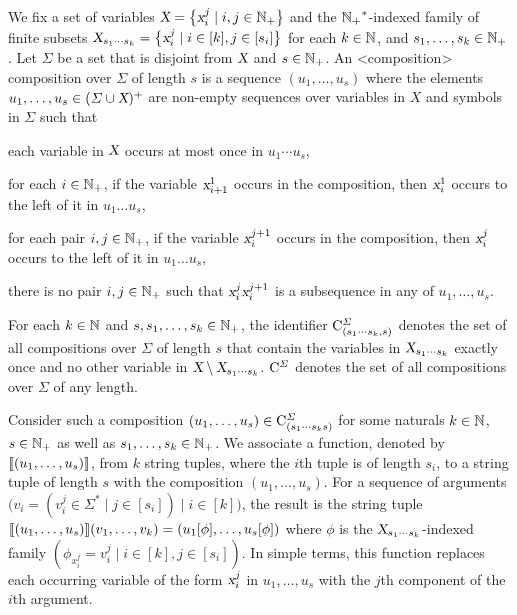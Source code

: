 \documentclass[../../document.tex]{subfiles}
\begin{document}
    \begin{definition}[Compositions]\label{def:lcfrs:comp}
        We fix a set of variables \(\textsl{X} = \big\{ \textsl{x}_i^j \mid i, j \in \mathbb{N}_+ \big\}\) and the \({\mathbb{N}_+}^*\)-indexed family of finite subsets \(\textsl{X}_{s_1\cdots s_k} = \big\{ \textsl{x}_i^j \mid i \in [k], j \in [s_i] \big\}\) for each \(k \in \mathbb{N}\), and \(s_1, \ldots, s_k \in \mathbb{N}_+\).
        Let \(\varSigma\) be a set that is disjoint from \(\textsl{X}\) and \(s \in \mathbb{N}_+\).
        An <composition>{ composition} over \(\varSigma\) of length \(s\) is a sequence \((u_1, \ldots, u_s)\) where the elements \(u_1, \dots, u_s \in (\varSigma \cup \textsl{X})^+\) are non-empty sequences over variables in \(X\) and symbols in \(\varSigma\) such that
        \begin{compactenum}
            \item each variable in \(\textsl{X}\) occurs at most once in \(u_1 \cdots u_s\),
            \item for each \(i \in \mathbb{N}_+\), if the variable \(\textsl{x}_{i+1}^1\) occurs in the composition, then \(\textsl{x}_i^1\) occurs to the left of it in \(u_1 \ldots u_s\),
            \item for each pair \(i, j \in \mathbb{N}_+\), if the variable \(\textsl{x}_i^{j+1}\) occurs in the composition, then \(\textsl{x}_i^j\) occurs to the left of it in \(u_1 \ldots u_s\),
            \item there is no pair \(i, j \in \mathbb{N}_+\) such that \(\textsl{x}^j_i\textsl{x}^{j+1}_i\) is a subsequence in any of \(u_1, \ldots, u_s\).
        \end{compactenum}
        For each \(k\in \mathbb{N}\) and \(s, s_1, \ldots, s_k \in \mathbb{N}_+\), the identifier \(\mathrm{C}^\varSigma_{(s_1\cdots s_k, s)}\) denotes the set of all  compositions over \(\varSigma\) of length \(s\) that contain the variables in \(\textsl{X}_{s_1 \cdots s_k}\) exactly once and no other variable in \(\textsl{X} \setminus \textsl{X}_{s_1\cdots s_k}\).
        \(\mathrm{C}^\varSigma\) denotes the set of all  compositions over \(\varSigma\) of any length.

        Consider such a composition \((u_1, \ldots, u_s) \in \mathrm{C}^\varSigma_{(s_1\cdots s_k s)}\) for some naturals \(k \in \mathbb{N}\), \(s\in \mathbb{N}_+\) as well as \(s_1, \ldots, s_k \in \mathbb{N}_+\).
        We associate a function, denoted by \(\llbracket(u_1, \ldots, u_s)\rrbracket\), from \(k\) string tuples, where the \(i\)th tuple is of length \(s_i\), to a string tuple of length \(s\) with the composition \((u_1, \ldots, u_s)\).
        For a sequence of arguments \(\big(v_i = (v_i^j \in \varSigma^* \mid j \in [s_i]) \mid i \in [k]\big)\), the result is the string tuple \(
        \llbracket(u_1, \ldots, u_s)\rrbracket(v_1, \ldots, v_k) = (u_1[\phi], \ldots, u_s[\phi])
        \) where \(\phi\) is the \(\textsl{X}_{s_1 \cdots s_k}\)-indexed family \((\phi_{x_i^j} = v_i^j \mid i \in[k], j \in [s_i])\).
        In simple terms, this function replaces each occurring variable of the form \(\textsl{x}_i^j\) in \(u_1, \ldots, u_s\) with the \(j\)th component of the \(i\)th argument.
    \end{definition}
\end{document}
